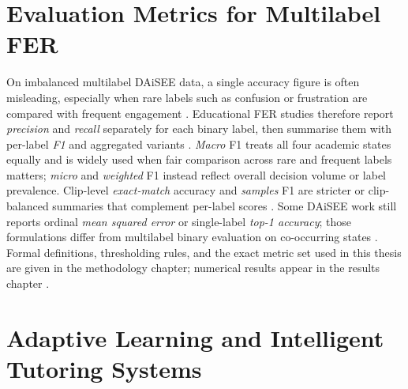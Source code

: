 \section{Evaluation Metrics for Multilabel FER}\label{sec:bg:metrics}

On imbalanced multilabel DAiSEE data, a single accuracy figure is often misleading, especially when rare labels such as confusion or frustration are compared with frequent engagement \cite{gupta_daisee_2016,lek_academic_2023,mehta_three-dimensional_2022}. Educational FER studies therefore report \emph{precision} and \emph{recall} separately for each binary label, then summarise them with per-label \emph{F1} and aggregated variants \cite{rianto_engagement_2025,fu_integrating_2025}. \emph{Macro} F1 treats all four academic states equally and is widely used when fair comparison across rare and frequent labels matters; \emph{micro} and \emph{weighted} F1 instead reflect overall decision volume or label prevalence. Clip-level \emph{exact-match} accuracy and \emph{samples} F1 are stricter or clip-balanced summaries that complement per-label scores \cite{fu_integrating_2025,rianto_engagement_2025}. Some DAiSEE work still reports ordinal \emph{mean squared error} or single-label \emph{top-1 accuracy}; those formulations differ from multilabel binary evaluation on co-occurring states \cite{gupta_daisee_2016,su_leveraging_2024}. Formal definitions, thresholding rules, and the exact metric set used in this thesis are given in the methodology chapter; numerical results appear in the results chapter \cite{mehta_three-dimensional_2022,lek_academic_2023}.

\section{Adaptive Learning and Intelligent Tutoring Systems}\label{sec:bg:adaptive}

